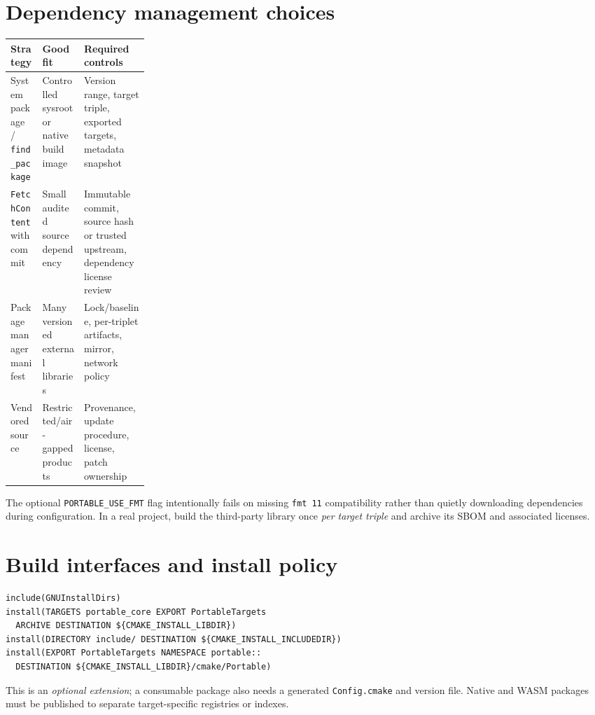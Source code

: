 \documentclass[11pt,letterpaper]{article}
\begin{document}
\section{Dependency management choices}
\noindent\begin{tabularx}{\linewidth}{>{\raggedright\arraybackslash}p{0.23\linewidth}>{\raggedright\arraybackslash}X >{\raggedright\arraybackslash}X}
\toprule Strategy & Good fit & Required controls \\ \midrule
System package / \texttt{find\_package} & Controlled sysroot or native build image & Version range, target triple, exported targets, metadata snapshot \\
\texttt{FetchContent} with commit & Small audited source dependency & Immutable commit, source hash or trusted upstream, dependency license review \\
Package manager manifest & Many versioned external libraries & Lock/baseline, per-triplet artifacts, mirror, network policy \\
Vendored source & Restricted/air-gapped products & Provenance, update procedure, license, patch ownership \\
\bottomrule
\end{tabularx}
The optional \texttt{PORTABLE\_USE\_FMT} flag intentionally fails on missing \texttt{fmt 11} compatibility rather than quietly downloading dependencies during configuration. In a real project, build the third-party library once \emph{per target triple} and archive its SBOM and associated licenses.

\section{Build interfaces and install policy}
\begin{lstlisting}[language={},caption={Pattern for an installable core library}]
include(GNUInstallDirs)
install(TARGETS portable_core EXPORT PortableTargets
  ARCHIVE DESTINATION ${CMAKE_INSTALL_LIBDIR})
install(DIRECTORY include/ DESTINATION ${CMAKE_INSTALL_INCLUDEDIR})
install(EXPORT PortableTargets NAMESPACE portable::
  DESTINATION ${CMAKE_INSTALL_LIBDIR}/cmake/Portable)
\end{lstlisting}
This is an \emph{optional extension}; a consumable package also needs a generated \texttt{Config.cmake} and version file. Native and WASM packages must be published to separate target-specific registries or indexes.
\end{document}
